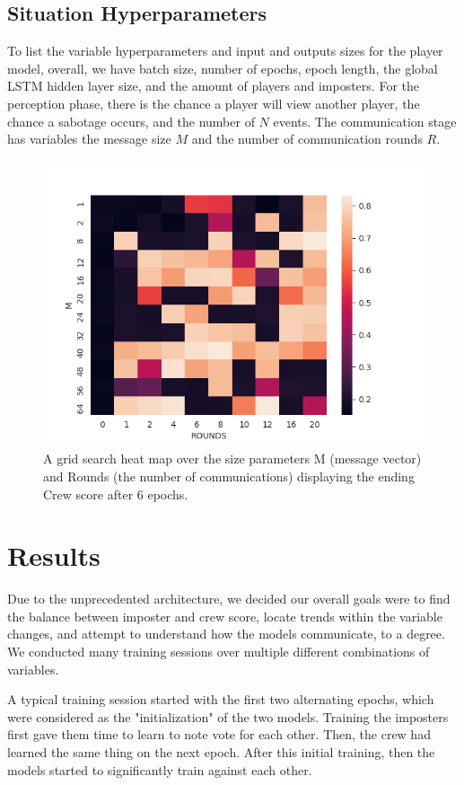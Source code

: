 \documentclass[10pt,twocolumn,letterpaper]{article}
\begin{document}
\subsection{Situation Hyperparameters}
To list the variable hyperparameters and input and outputs sizes for the player model,
overall, we have batch size, number of epochs, epoch length, the global LSTM hidden layer size, 
and the amount of players and imposters. For the perception phase, there is the
chance a player will view another player, the chance a sabotage occurs, and the number of $N$ events.  
The communication stage has variables the message size $M$ and the number of communication rounds
$R$.
\begin{figure}
   \begin{center}
      \includegraphics[width=0.8 \textwidth]{img/grid_search.png}
   \end{center}
      \caption{A grid search heat map over the size parameters M (message vector) 
      and Rounds (the number of communications) displaying the ending Crew score after 6 epochs.
      }
   \label{fig:model}
\end{figure}
\section{Results}
Due to the unprecedented architecture, we decided our overall goals
were to find the balance between imposter and crew
score, locate trends within the variable changes, and attempt to 
understand how the models communicate, to a degree. We conducted many
training sessions over multiple different combinations of variables.

A typical training session started with the first two alternating epochs,
which were considered as the "initialization" of the two models. Training the imposters
first gave them time to learn to note vote for each other. Then, the crew
had learned the same thing on the next epoch. After this initial training,
then the models started to significantly train against each other.
\end{document}
